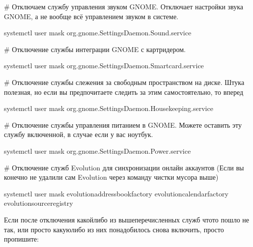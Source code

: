 \documentclass[letterpaper,10pt,russian,openany]{sphinxmanual}
\begin{document}
\sphinxAtStartPar
\# Отключаем службу управления звуком GNOME.
Отключает  настройки звука GNOME, а не вообще всё управлением звуком в системе.

\begin{sphinxVerbatim}[commandchars=\\\{\}]
systemctl \PYGZhy{}\PYGZhy{}user mask org.gnome.SettingsDaemon.Sound.service
\end{sphinxVerbatim}

\sphinxAtStartPar
\# Отключение службы интеграции GNOME с карт\sphinxhyphen{}ридером.

\begin{sphinxVerbatim}[commandchars=\\\{\}]
systemctl \PYGZhy{}\PYGZhy{}user mask org.gnome.SettingsDaemon.Smartcard.service
\end{sphinxVerbatim}

\sphinxAtStartPar
\# Отключение службы слежения за свободным пространством на диске.
Штука полезная, но если вы предпочитаете следить за этим самостоятельно, то вперед

\begin{sphinxVerbatim}[commandchars=\\\{\}]
systemctl \PYGZhy{}\PYGZhy{}user mask org.gnome.SettingsDaemon.Housekeeping.service
\end{sphinxVerbatim}

\sphinxAtStartPar
\# Отключение службы управления питанием в GNOME.
Можете оставить эту службу включенной, в случае если у вас ноутбук.

\begin{sphinxVerbatim}[commandchars=\\\{\}]
systemctl \PYGZhy{}\PYGZhy{}user mask org.gnome.SettingsDaemon.Power.service
\end{sphinxVerbatim}

\sphinxAtStartPar
\# Отключение служб Evolution для синхронизации онлайн аккаунтов
(Если вы конечно не удалили сам Evolution через команду чистки мусора выше)

\begin{sphinxVerbatim}[commandchars=\\\{\}]
systemctl \PYGZhy{}\PYGZhy{}user mask evolution\PYGZhy{}addressbook\PYGZhy{}factory evolution\PYGZhy{}calendar\PYGZhy{}factory evolution\PYGZhy{}source\PYGZhy{}registry
\end{sphinxVerbatim}

\sphinxAtStartPar
Если после отключения какой\sphinxhyphen{}либо из вышеперечисленных служб что\sphinxhyphen{}то пошло не так,
или просто какую\sphinxhyphen{}либо из них понадобилось снова включить, просто пропишите:
\end{document}
